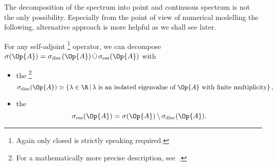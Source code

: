 The decomposition of the spectrum into point and continuous spectrum
is not the only possibility.
Especially from the point of view of numerical modelling
the following, alternative approach is more helpful
as we shall see later.

\begin{defn}
	\label{defn:EssentialSpectrum}
	For any self-adjoint%
	\footnote{Again only closed is strictly speaking required.}
	operator,
	we can decompose \linebreak
	$\sigma(\Op{A}) = \sigma_\text{disc}(\Op{A}) \, \dot{\cup} \, \sigma_\text{ess}(\Op{A})$
	with
	\begin{itemize}
		\item the %
			\footnote{For a mathematically more precise description, see~\cite[p.~103 and p.~132]{Helffer2013}.}
			\[ \sigma_\text{disc}(\Op{A}) \simeq \left\{ \lambda \in \R \, \middle|
			\, \text{$\lambda$ is an isolated eigenvalue of $\Op{A}$
			with finite multiplicity} \right\}, \]
		\item the 
			\[\sigma_\text{ess}(\Op{A}) 
			= \sigma(\Op{A}) \, \backslash \, \sigma_\text{disc}(\Op{A}). \]
	\end{itemize}
\end{defn}

